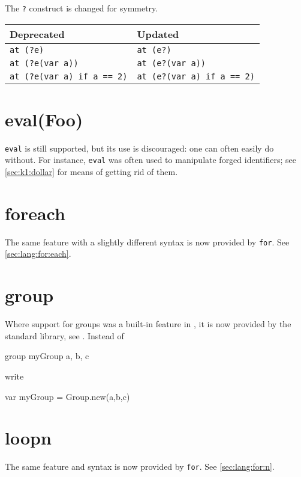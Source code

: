 The \lstinline{?} construct is changed for symmetry.

\begin{center}
  \begin{tabular}{|l|l|}
    \hline
    \textbf{Deprecated} & \textbf{Updated}  \\
    \hline
    \lstinline|at (?e)|                  & \lstinline|at (e?)|\\
    \lstinline|at (?e(var a))|           & \lstinline|at (e?(var a))|\\
    \lstinline|at (?e(var a) if a == 2)| & \lstinline|at (e?(var a) if a == 2)|\\
    \hline
  \end{tabular}
\end{center}


\section{eval(Foo)}
\lstinline{eval} is still supported, but its use is discouraged: one
can often easily do without.  For instance, \lstinline{eval} was often
used to manipulate forged identifiers; see \autoref{sec:k1:dollar}
for means of getting rid of them.

\section{foreach}
The same feature with a slightly different syntax is now provided by
\lstinline|for|.  See \autoref{sec:lang:for:each}.

\section{group}
Where support for groups was a built-in feature in , it is now
provided by the standard library, see .  Instead of
\begin{urbiunchecked}
group myGroup {a, b, c}
\end{urbiunchecked}
\noindent
write
\begin{urbiunchecked}
var myGroup = Group.new(a,b,c)
\end{urbiunchecked}

\section{loopn}
\label{sec:k1:loopn}
The same feature and syntax is now provided by \lstinline|for|.  See
\autoref{sec:lang:for:n}.

